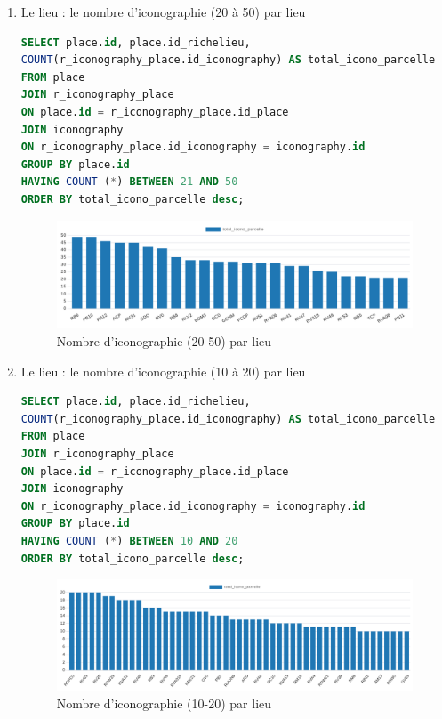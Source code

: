 \begin{enumerate}
\begin{enumerate}
\newpage
\item Le lieu : le nombre d'iconographie (20 à 50) par lieu
            \begin{lstlisting}[language=SQL, caption=Nombre d'iconographies par lieu 20-50]
SELECT place.id, place.id_richelieu,  
COUNT(r_iconography_place.id_iconography) AS total_icono_parcelle 
FROM place 
JOIN r_iconography_place 
ON place.id = r_iconography_place.id_place 
JOIN iconography  
ON r_iconography_place.id_iconography = iconography.id 
GROUP BY place.id 
HAVING COUNT (*) BETWEEN 21 AND 50
ORDER BY total_icono_parcelle desc; \end{lstlisting}
\begin{figure}[ht!]
                \centering
                \includegraphics[width=1\linewidth]{images/graphiques/nb_icono_lieu_20-50.png}
                \caption{Nombre d'iconographie (20-50) par lieu}
                \label{fig:nb_icono_lieu_20-50}
            \end{figure}    

\newpage
\item Le lieu : le nombre d'iconographie (10 à 20) par lieu
            \begin{lstlisting}[language=SQL, caption=Nombre d'iconographies par lieu 10-20]
SELECT place.id, place.id_richelieu,  
COUNT(r_iconography_place.id_iconography) AS total_icono_parcelle 
FROM place 
JOIN r_iconography_place 
ON place.id = r_iconography_place.id_place 
JOIN iconography  
ON r_iconography_place.id_iconography = iconography.id 
GROUP BY place.id 
HAVING COUNT (*) BETWEEN 10 AND 20
ORDER BY total_icono_parcelle desc; \end{lstlisting}
\begin{figure}[ht!]
                \centering
                \includegraphics[width=1\linewidth]{images/graphiques/nb_icono_lieu_10-20.png}
                \caption{Nombre d'iconographie (10-20) par lieu}
                \label{fig:nb_icono_lieu_10-20}
            \end{figure}    


\end{enumerate}
\end{enumerate}
